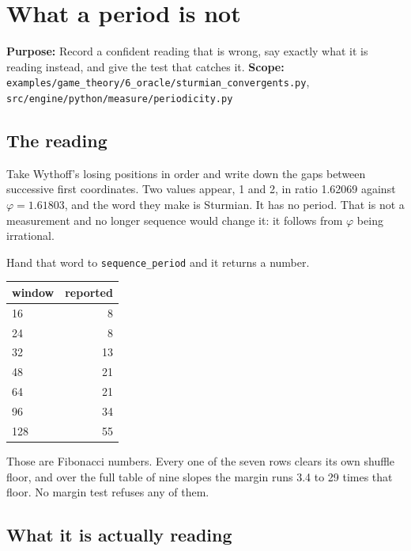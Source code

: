 \chapter{What a period is not}

\textbf{Purpose:} Record a confident reading that is wrong, say exactly what it is reading instead,
and give the test that catches it. \textbf{Scope:}
\texttt{examples/\allowbreak{}game\_\allowbreak{}theory/\allowbreak{}6\_\allowbreak{}oracle/\allowbreak{}sturmian\_\allowbreak{}convergents.\allowbreak{}py},
\texttt{src/\allowbreak{}engine/\allowbreak{}python/\allowbreak{}measure/\allowbreak{}periodicity.\allowbreak{}py}

\section{The reading}

Take Wythoff's losing positions in order and write down the gaps between successive first
coordinates. Two values appear, 1 and 2, in ratio 1.62069 against \(\varphi = 1.61803\), and the word
they make is Sturmian. It has no period. That is not a measurement and no longer sequence would
change it: it follows from \(\varphi\) being irrational.

Hand that word to \texttt{sequence\_period} and it returns a number.

\begin{center}
\begin{tabular}{@{}lr@{}}
\toprule
window & reported \\
\midrule
16 & 8 \\
24 & 8 \\
32 & 13 \\
48 & 21 \\
64 & 21 \\
96 & 34 \\
128 & 55 \\
\bottomrule
\end{tabular}
\end{center}

Those are Fibonacci numbers. Every one of the seven rows clears its own shuffle floor, and over the
full table of nine slopes the margin runs 3.4 to 29 times that floor. No margin test refuses any of
them.

\section{What it is actually reading}

